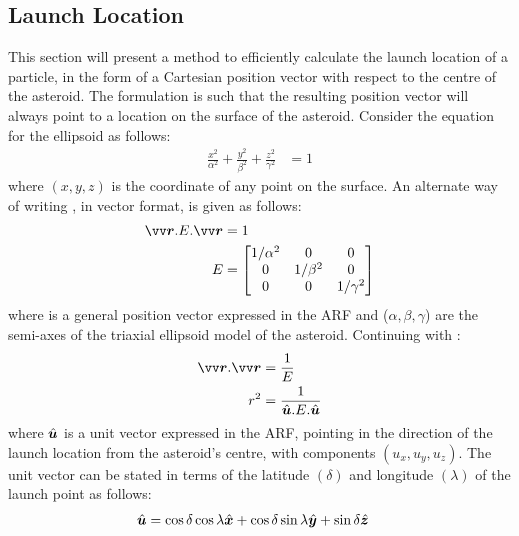 \subsection{Launch Location}
\label{subsec:launch_location}
This section will present a method to efficiently calculate the launch location of a particle, in the form of a Cartesian position vector with respect to the centre of the asteroid. The formulation is such that the resulting position vector will always point to a location on the surface of the asteroid.
%
\newline\newline
%
Consider the equation for the ellipsoid as follows:
\begin{align}
    \frac{x^2}{\alpha^2} + \frac{y^2}{\beta^2} + \frac{z^2}{\gamma^2} &= 1
    \label{eqn:launch_loc_ellipsoid_eqn_cartesian}
\end{align}
where $(x,y,z)$ is the coordinate of any point on the surface. An alternate way of writing , in vector format, is given as follows:
\begin{align}
    \bv{r}.E.\bv{r} &= 1
    \label{eqn:launch_loc_ellipsoid_eqn_vectorForm} \\
    E &=
    \begin{bmatrix}
        1/\alpha^2 & 0 & 0 \\
        0 & 1/\beta^2 & 0 \\
        0 & 0 & 1/\gamma^2
    \end{bmatrix}
\end{align}
where  is a general position vector expressed in the \gls{ARF} and ($\alpha, \beta, \gamma$) are the semi-axes of the triaxial ellipsoid model of the asteroid. Continuing with :
\begin{align}
    \bv{r}.\bv{r} &= \frac{1}{E} \\
    r^2 &= \frac{1}{\buvec{u}.E.\buvec{u}}
    \label{eqn:launch_loc_r_square}
\end{align}
where $\hat{\bm{u}}$ is a unit vector expressed in the \gls{ARF}, pointing in the direction of the launch location from the asteroid's centre, with components $(u_x, u_y, u_z)$. The unit vector can be stated in terms of the latitude $(\delta)$ and longitude $(\lambda)$ of the launch point as follows:
\begin{align}
    \hat{\bm{u}} &= \cos\delta \cos\lambda \hat{\bm{x}} + \cos\delta \sin\lambda \hat{\bm{y}} + \sin\delta \hat{\bm{z}}
\end{align}
